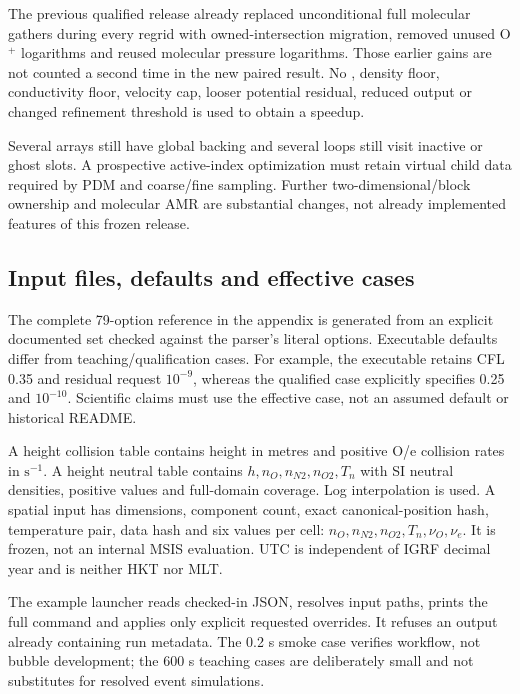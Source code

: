 The previous qualified release already replaced unconditional full
molecular gathers during every regrid with owned-intersection migration,
removed unused O$^+$ logarithms and reused molecular pressure logarithms.
Those earlier gains are not counted a second time in the new paired result.
No , density floor, conductivity floor, velocity cap,
looser potential residual, reduced output or changed refinement threshold
is used to obtain a speedup.

Several arrays still have global backing and several loops still visit
inactive or ghost slots. A prospective active-index optimization must
retain virtual child data required by PDM and coarse/fine sampling.
Further two-dimensional/block ownership and molecular AMR are substantial
changes, not already implemented features of this frozen release.

\subsection{Input files, defaults and effective cases}
The complete 79-option reference in the appendix is generated from an
explicit documented set checked against the parser's literal options.
Executable defaults differ from teaching/qualification cases. For example,
the executable retains CFL 0.35 and residual request $10^{-9}$, whereas the
qualified case explicitly specifies 0.25 and $10^{-10}$. Scientific claims
must use the effective case, not an assumed default or historical README.

A height collision table contains height in metres and positive O/e
collision rates in $\mathrm{s^{-1}}$. A height neutral table contains
$h,n_O,n_{N2},n_{O2},T_n$ with SI neutral densities, positive values and
full-domain coverage. Log interpolation is used. A spatial 
input has dimensions, component count, exact canonical-position hash,
temperature pair, data hash and six values per cell: $n_O,n_{N2},n_{O2},T_n,
\nu_O,\nu_e$. It is frozen, not an internal MSIS evaluation. UTC is
independent of IGRF decimal year and is neither HKT nor MLT.

The example launcher reads checked-in JSON, resolves input paths, prints
the full command and applies only explicit requested overrides. It refuses
an output already containing run metadata. The 0.2 s smoke case verifies
workflow, not bubble development; the 600 s teaching cases are deliberately
small and not substitutes for resolved event simulations.

